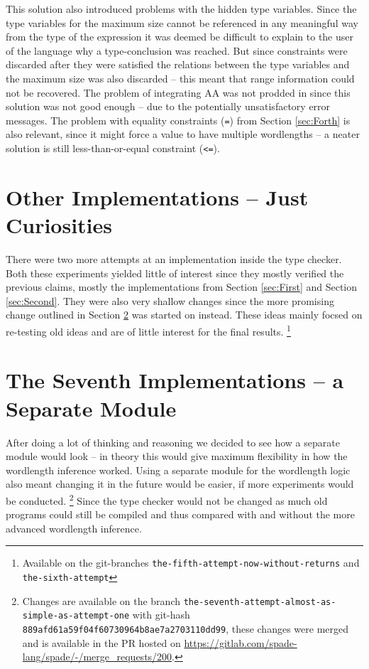 This solution also introduced problems with the hidden type variables. Since the type variables for the maximum size cannot be referenced in any meaningful way from the type of the expression it was deemed be difficult to explain to the user of the language why a type-conclusion was reached. But since constraints were discarded after they were satisfied the relations between the type variables and the maximum size was also discarded -- this meant that range information could not be recovered. The problem of integrating AA was not prodded in since this solution was not good enough -- due to the potentially unsatisfactory error messages. The problem with equality constraints (\verb+=+) from Section \ref{sec:Forth} is also relevant, since it might force a value to have multiple wordlengths -- a neater solution is still less-than-or-equal constraint (\verb+<=+).

\section{Other Implementations -- Just Curiosities}
\label{sec:Other}

There were two more attempts at an implementation inside the type checker. Both these experiments yielded little of interest since they mostly verified the previous claims, mostly the implementations from Section \ref{sec:First} and Section \ref{sec:Second}. They were also very shallow changes since the more promising change outlined in Section \ref{sec:Seven} was started on instead. These ideas mainly focsed on re-testing old ideas and are of little interest for the final results.
\cprotect\footnote{Available on the git-branches \verb+the-fifth-attempt-now-without-returns+ and \verb+the-sixth-attempt+}


\section{The Seventh Implementations -- a Separate Module}
\label{sec:Seven}
After doing a lot of thinking and reasoning we decided to see how a separate module would look -- in theory this would give maximum flexibility in how the wordlength inference worked. Using a separate module for the wordlength logic also meant changing it in the future would be easier, if more experiments would be conducted.%
\cprotect\footnote{Changes are available on the branch \verb+the-seventh-attempt-almost-as-simple-as-attempt-one+ with git-hash \verb+889afd61a59f04f60730964b8ae7a2703110dd99+, these changes were merged and is available in the PR hosted on \url{https://gitlab.com/spade-lang/spade/-/merge_requests/200}.}%
Since the type checker would not be changed as much old programs could still be compiled and thus compared with and without the more advanced wordlength inference.%



